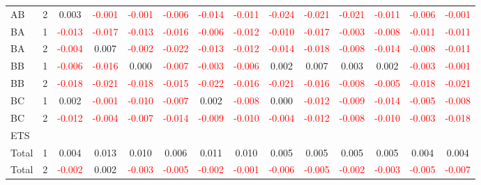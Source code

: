 \begin{table}[H]
{\begin{tabular}{llcccccccccccc}
AB & 2 & 0.003 & \textcolor{red}{-0.001} & \textcolor{red}{-0.001} & \textcolor{red}{-0.006} & \textcolor{red}{-0.014} & \textcolor{red}{-0.011} & \textcolor{red}{-0.024} & \textcolor{red}{-0.021} & \textcolor{red}{-0.021} & \textcolor{red}{-0.011} & \textcolor{red}{-0.006} & \textcolor{red}{-0.001}\\
BA & 1 & \textcolor{red}{-0.013} & \textcolor{red}{-0.017} & \textcolor{red}{-0.013} & \textcolor{red}{-0.016} & \textcolor{red}{-0.006} & \textcolor{red}{-0.012} & \textcolor{red}{-0.010} & \textcolor{red}{-0.017} & \textcolor{red}{-0.003} & \textcolor{red}{-0.008} & \textcolor{red}{-0.011} & \textcolor{red}{-0.011}\\
BA & 2 & \textcolor{red}{-0.004} & 0.007 & \textcolor{red}{-0.002} & \textcolor{red}{-0.022} & \textcolor{red}{-0.013} & \textcolor{red}{-0.012} & \textcolor{red}{-0.014} & \textcolor{red}{-0.018} & \textcolor{red}{-0.008} & \textcolor{red}{-0.014} & \textcolor{red}{-0.008} & \textcolor{red}{-0.011}\\
BB & 1 & \textcolor{red}{-0.006} & \textcolor{red}{-0.016} & 0.000 & \textcolor{red}{-0.007} & \textcolor{red}{-0.003} & \textcolor{red}{-0.006} & 0.002 & 0.007 & 0.003 & 0.002 & \textcolor{red}{-0.003} & \textcolor{red}{-0.001}\\
BB & 2 & \textcolor{red}{-0.018} & \textcolor{red}{-0.021} & \textcolor{red}{-0.018} & \textcolor{red}{-0.015} & \textcolor{red}{-0.022} & \textcolor{red}{-0.016} & \textcolor{red}{-0.021} & \textcolor{red}{-0.016} & \textcolor{red}{-0.008} & \textcolor{red}{-0.005} & \textcolor{red}{-0.018} & \textcolor{red}{-0.021}\\
BC & 1 & 0.002 & \textcolor{red}{-0.001} & \textcolor{red}{-0.010} & \textcolor{red}{-0.007} & 0.002 & \textcolor{red}{-0.008} & 0.000 & \textcolor{red}{-0.012} & \textcolor{red}{-0.009} & \textcolor{red}{-0.014} & \textcolor{red}{-0.005} & \textcolor{red}{-0.008}\\
BC & 2 & \textcolor{red}{-0.012} & \textcolor{red}{-0.004} & \textcolor{red}{-0.007} & \textcolor{red}{-0.014} & \textcolor{red}{-0.009} & \textcolor{red}{-0.010} & \textcolor{red}{-0.004} & \textcolor{red}{-0.012} & \textcolor{red}{-0.008} & \textcolor{red}{-0.010} & \textcolor{red}{-0.003} & \textcolor{red}{-0.018}\\
\hline
ETS &  &  &  &  &  &  &  &  &  &  &  &  & \\
\hline
Total & 1 & 0.004 & 0.013 & 0.010 & 0.006 & 0.011 & 0.010 & 0.005 & 0.005 & 0.005 & 0.005 & 0.004 & 0.004\\
Total & 2 & \textcolor{red}{-0.002} & 0.002 & \textcolor{red}{-0.003} & \textcolor{red}{-0.005} & \textcolor{red}{-0.002} & \textcolor{red}{-0.001} & \textcolor{red}{-0.006} & \textcolor{red}{-0.005} & \textcolor{red}{-0.002} & \textcolor{red}{-0.003} & \textcolor{red}{-0.005} & \textcolor{red}{-0.007}\\

\end{tabular}}
\end{table}
